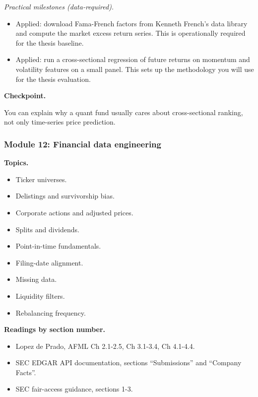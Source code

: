 \emph{Practical milestones (data-required).}

\begin{itemize}
\tightlist
\item
  Applied: download Fama-French factors from Kenneth French's data
  library and compute the market excess return series. This is
  operationally required for the thesis baseline.
\item
  Applied: run a cross-sectional regression of future returns on
  momentum and volatility features on a small panel. This sets up the
  methodology you will use for the thesis evaluation.
\end{itemize}

\textbf{Checkpoint.}

You can explain why a quant fund usually cares about cross-sectional
ranking, not only time-series price prediction.

\subsubsection{Module 12: Financial data
engineering}\label{module-12-financial-data-engineering}

\textbf{Topics.}

\begin{itemize}
\tightlist
\item
  Ticker universes.
\item
  Delistings and survivorship bias.
\item
  Corporate actions and adjusted prices.
\item
  Splits and dividends.
\item
  Point-in-time fundamentals.
\item
  Filing-date alignment.
\item
  Missing data.
\item
  Liquidity filters.
\item
  Rebalancing frequency.
\end{itemize}

\textbf{Readings by section number.}

\begin{itemize}
\tightlist
\item
  Lopez de Prado, AFML Ch 2.1-2.5, Ch 3.1-3.4, Ch 4.1-4.4.
\item
  SEC EDGAR API documentation, sections ``Submissions'' and ``Company
  Facts''.
\item
  SEC fair-access guidance, sections 1-3.
\end{itemize}

